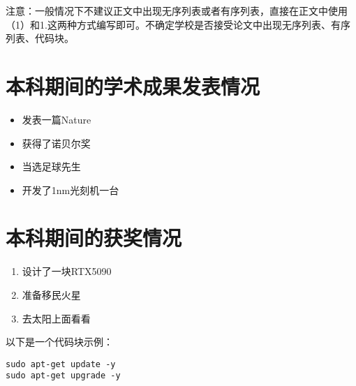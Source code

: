 \documentclass[bachelor]{njupthesis}
\begin{document}
注意：一般情况下不建议正文中出现无序列表或者有序列表，直接在正文中使用（1）和1.这两种方式编写即可。不确定学校是否接受论文中出现无序列表、有序列表、代码块。

\section{本科期间的学术成果发表情况}
\begin{itemize} %
	\item 发表一篇Nature
	\item 获得了诺贝尔奖
	\item 当选足球先生
	\item 开发了1nm光刻机一台
\end{itemize}

\section{本科期间的获奖情况}
\begin{enumerate} %
	\item 设计了一块RTX5090
	\item 准备移民火星
	\item 去太阳上面看看
\end{enumerate}

以下是一个代码块示例：

\lstset{language=bash} %
\begin{lstlisting}[caption={更新Ubuntu软件}, label={code:apt-update}]
sudo apt-get update -y
sudo apt-get upgrade -y
\end{lstlisting}
\end{document}
